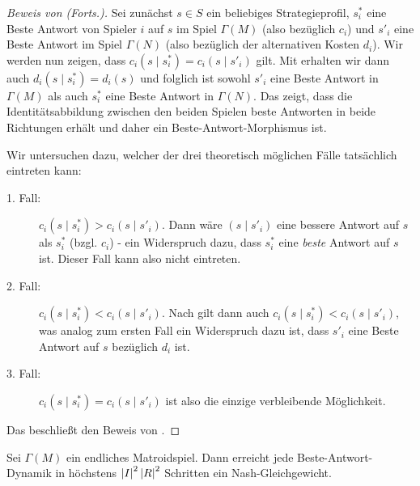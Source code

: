 \begin{proof}[Beweis von  (Forts.)]
	Sei zunächst $s \in S$ ein beliebiges Strategieprofil, $s^\ast_i$ eine Beste Antwort von Spieler $i$ auf $s$ im Spiel $\Gamma(M)$ (also bezüglich $c_i$) und $s'_i$ eine Beste Antwort im Spiel $\Gamma(N)$ (also bezüglich der alternativen Kosten $d_i$). Wir werden nun zeigen, dass $c_i(s \mid s^\ast_i) = c_i(s \mid s'_i)$ gilt. Mit  erhalten wir dann auch $d_i(s \mid s^\ast_i) = d_i(s)$ und folglich ist sowohl $s'_i$ eine Beste Antwort in $\Gamma(M)$ als auch $s^\ast_i$ eine Beste Antwort in $\Gamma(N)$. Das zeigt, dass die Identitätsabbildung zwischen den beiden Spielen beste Antworten in beide Richtungen erhält und daher ein Beste-Antwort-Morphismus ist. 
	
	Wir untersuchen dazu, welcher der drei theoretisch möglichen Fälle tatsächlich eintreten kann:
	\begin{description}
		\item[1. Fall:] $c_i(s \mid s^\ast_i) > c_i(s \mid s'_i)$. Dann wäre $(s \mid s'_i)$ eine bessere Antwort auf $s$ als $s^\ast_i$ (bzgl. $c_i$) - ein Widerspruch dazu, dass $s^\ast_i$ eine \emph{beste} Antwort auf $s$ ist. Dieser Fall kann also nicht eintreten.
		\item[2. Fall:] $c_i(s \mid s^\ast_i) < c_i(s \mid s'_i)$. Nach  gilt dann auch $c_i(s \mid s^\ast_i) < c_i(s \mid s'_i)$, was analog zum ersten Fall ein Widerspruch dazu ist, dass $s'_i$ eine Beste Antwort auf $s$ bezüglich $d_i$ ist.
		\item[3. Fall:] $c_i(s \mid s^\ast_i) = c_i(s \mid s'_i)$ ist also die einzige verbleibende Möglichkeit.
	\end{description}
	Das beschließt den Beweis von .
\end{proof}

\begin{kor}\label{kor:BA-DynamikInMatroidSpielen}
	Sei $\Gamma(M)$ ein endliches Matroidspiel. Dann erreicht jede Beste-Antwort-Dynamik in höchstens $\left|I\right|^2\left|R\right|^2$ Schritten ein Nash-Gleichgewicht.
\end{kor}

